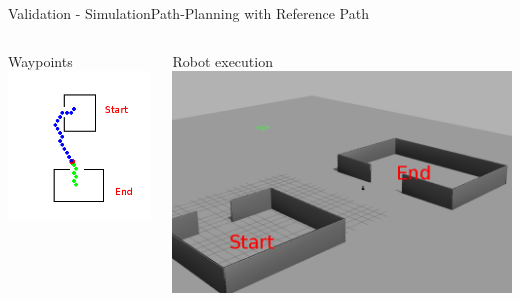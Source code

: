 \begin{frame}{Validation - Simulation}{Path-Planning with Reference Path}
\begin{columns}
\begin{minipage}{\textwidth}
\begin{block}{Waypoints}
\centering
\includegraphics[width = \textwidth]{./figure/simulation/waypoint.png}
\end{block}
\end{minipage}


\begin{minipage}{\textwidth}
\begin{block}{Robot execution}
\centering
\includegraphics[width = \textwidth]{./figure/simulation/gazebo2.png}
\end{block}
\end{minipage}

\end{columns}

\end{frame}

